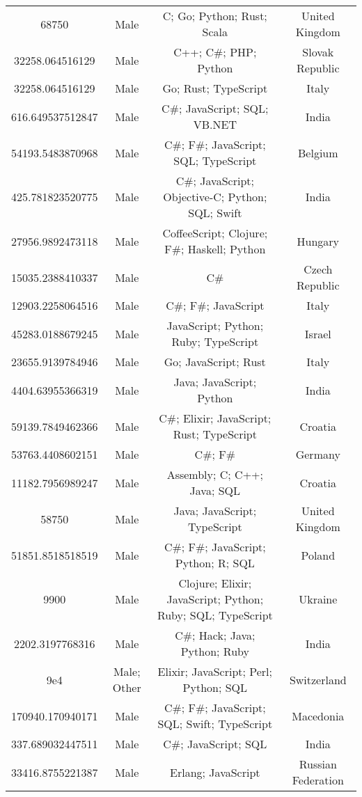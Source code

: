 \begin{center}
\begin{tabular}{ |c|c|c|c| }
68750  &  Male  &  C; Go; Python; Rust; Scala  &  United Kingdom  \\ 
32258.064516129  &  Male  &  C++; C\#; PHP; Python  &  Slovak Republic  \\ 
32258.064516129  &  Male  &  Go; Rust; TypeScript  &  Italy  \\ 
616.649537512847  &  Male  &  C\#; JavaScript; SQL; VB.NET  &  India  \\ 
54193.5483870968  &  Male  &  C\#; F\#; JavaScript; SQL; TypeScript  &  Belgium  \\ 
425.781823520775  &  Male  &  C\#; JavaScript; Objective-C; Python; SQL; Swift  &  India  \\ 
27956.9892473118  &  Male  &  CoffeeScript; Clojure; F\#; Haskell; Python  &  Hungary  \\ 
15035.2388410337  &  Male  &  C\#  &  Czech Republic  \\ 
12903.2258064516  &  Male  &  C\#; F\#; JavaScript  &  Italy  \\ 
45283.0188679245  &  Male  &  JavaScript; Python; Ruby; TypeScript  &  Israel  \\ 
23655.9139784946  &  Male  &  Go; JavaScript; Rust  &  Italy  \\ 
4404.63955366319  &  Male  &  Java; JavaScript; Python  &  India  \\ 
59139.7849462366  &  Male  &  C\#; Elixir; JavaScript; Rust; TypeScript  &  Croatia  \\ 
53763.4408602151  &  Male  &  C\#; F\#  &  Germany  \\ 
11182.7956989247  &  Male  &  Assembly; C; C++; Java; SQL  &  Croatia  \\ 
58750  &  Male  &  Java; JavaScript; TypeScript  &  United Kingdom  \\ 
51851.8518518519  &  Male  &  C\#; F\#; JavaScript; Python; R; SQL  &  Poland  \\ 
9900  &  Male  &  Clojure; Elixir; JavaScript; Python; Ruby; SQL; TypeScript  &  Ukraine  \\ 
2202.3197768316  &  Male  &  C\#; Hack; Java; Python; Ruby  &  India  \\ 
9e4  &  Male; Other  &  Elixir; JavaScript; Perl; Python; SQL  &  Switzerland  \\ 
170940.170940171  &  Male  &  C\#; F\#; JavaScript; SQL; Swift; TypeScript  &  Macedonia  \\ 
337.689032447511  &  Male  &  C\#; JavaScript; SQL  &  India  \\ 
33416.8755221387  &  Male  &  Erlang; JavaScript  &  Russian Federation  \\ 

\end{tabular}
\end{center}

